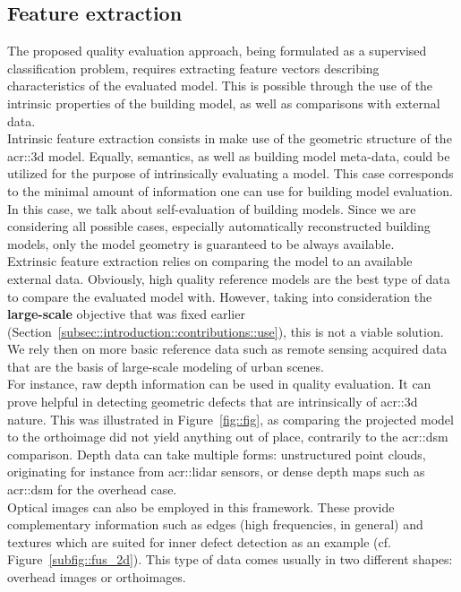     \subsection{Feature extraction}
        \label{subsec::learned_evaluation::classification::feature_extraction}
        The proposed quality evaluation approach, being formulated as a supervised classification problem, requires extracting feature vectors describing characteristics of the evaluated model.
        This is possible through the use of the intrinsic properties of the building model, as well as comparisons with external data.\\
    
        Intrinsic feature extraction consists in make use of the geometric structure of the \gls{acr::3d} model.
        Equally, semantics, as well as building model meta-data, could be utilized for the purpose of intrinsically evaluating a model.
        This case corresponds to the minimal amount of information one can use for building model evaluation.
        In this case, we talk about self-evaluation of building models.
        Since we are considering all possible cases, especially automatically reconstructed building models, only the model geometry is guaranteed to be always available.\\
    
        Extrinsic feature extraction relies on comparing the model to an available external data.
        Obviously, high quality reference models are the best type of data to compare the evaluated model with.
        However, taking into consideration the \textbf{large-scale} objective that was fixed earlier (Section~\ref{subsec::introduction::contributions::use}), this is not a viable solution.
        We rely then on more basic reference data such as remote sensing acquired data that are the basis of large-scale modeling of urban scenes.\\
        For instance, raw depth information can be used in quality evaluation.
        It can prove helpful in detecting geometric defects that are intrinsically of \gls{acr::3d} nature.
        This was illustrated in Figure~\ref{fig::fig}, as comparing the projected model to the orthoimage did not yield anything out of place, contrarily to the \gls{acr::dsm} comparison.
        Depth data can take multiple forms: unstructured point clouds, originating for instance from \gls{acr::lidar} sensors, or dense depth maps such as \gls{acr::dsm} for the overhead case.\\
        Optical images can also be employed in this framework.
        These provide complementary information such as edges (high frequencies, in general) and textures which are suited for inner defect detection as an example (cf. Figure~\ref{subfig::fus_2d}).
        This type of data comes usually in two different shapes: overhead images or orthoimages.
    
